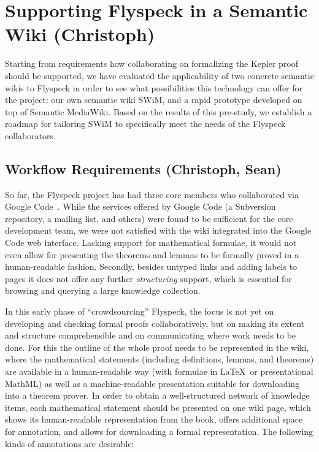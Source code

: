 \documentclass{llncs}
\begin{document}
\section{Supporting Flyspeck in a Semantic Wiki (Christoph)}

Starting from requirements how collaborating on formalizing the Kepler proof should be
supported, we have evaluated the applicability of two concrete semantic wikis to Flyspeck
in order to see what possibilities this technology can offer for the project:  our own
semantic wiki SWiM, and a rapid prototype developed on top of Semantic MediaWiki.  Based on the
results of this pre-study, we establish a roadmap for tailoring SWiM to specifically meet
the needs of the Flyspeck collaborators.

\subsection{Workflow Requirements (Christoph, Sean)}
\label{sec:req}

So far, the Flyspeck project has had three core members who
collaborated via Google Code~\cite{flyspeck:web}.  While the services offered by Google
Code (a Subversion repository, a mailing list, and others) were found to be sufficient for
the core development team, we were not satisfied with the wiki integrated into the Google
Code web interface.  Lacking support for mathematical formulae, it would not even allow
for presenting the theorems and lemmas to be formally proved in a human-readable fashion.
Secondly, besides untyped links and adding labels to pages it does not offer any further
\emph{structuring} support, which is essential for browsing and querying a large
knowledge collection.

In this early phase of ``crowdsourcing'' Flyspeck, the focus is not yet on developing and
checking formal proofs collaboratively, but on making its extent and structure
comprehensible and on communicating where work needs to be done.  For this the outline of
the whole proof needs to be
represented in the wiki, where the mathematical statements (including definitions, lemmas,
and theorems) are available in a human-readable way (with formulae in \LaTeX\ or
presentational MathML) as well as a machine-readable presentation suitable for downloading
into a theorem prover.  In order to obtain a well-structured network of knowledge items,
each mathematical statement should be presented on one wiki page, which shows its
human-readable representation from the book, offers additional space for annotation, and
allows for downloading a formal representation.  The following kinds of annotations are
desirable:
\end{document}
